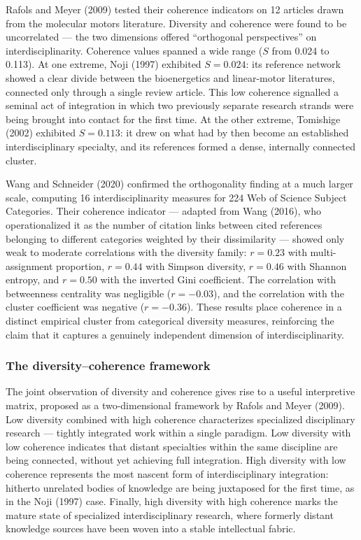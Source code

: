 \documentclass[
]{article}
\begin{document}
Rafols and Meyer (2009) tested their coherence indicators on 12 articles
drawn from the molecular motors literature. Diversity and coherence were
found to be uncorrelated --- the two dimensions offered ``orthogonal
perspectives'' on interdisciplinarity. Coherence values spanned a wide
range (\(S\) from 0.024 to 0.113). At one extreme, Noji (1997) exhibited
\(S = 0.024\): its reference network showed a clear divide between the
bioenergetics and linear-motor literatures, connected only through a
single review article. This low coherence signalled a seminal act of
integration in which two previously separate research strands were being
brought into contact for the first time. At the other extreme, Tomishige
(2002) exhibited \(S = 0.113\): it drew on what had by then become an
established interdisciplinary specialty, and its references formed a
dense, internally connected cluster.

Wang and Schneider (2020) confirmed the orthogonality finding at a much
larger scale, computing 16 interdisciplinarity measures for 224 Web of
Science Subject Categories. Their coherence indicator --- adapted from
Wang (2016), who operationalized it as the number of citation links
between cited references belonging to different categories weighted by
their dissimilarity --- showed only weak to moderate correlations with
the diversity family: \(r = 0.23\) with multi-assignment proportion,
\(r = 0.44\) with Simpson diversity, \(r = 0.46\) with Shannon entropy,
and \(r = 0.50\) with the inverted Gini coefficient. The correlation
with betweenness centrality was negligible (\(r = -0.03\)), and the
correlation with the cluster coefficient was negative (\(r = -0.36\)).
These results place coherence in a distinct empirical cluster from
categorical diversity measures, reinforcing the claim that it captures a
genuinely independent dimension of interdisciplinarity.

\hypertarget{the-diversitycoherence-framework}{%
\subsubsection{The diversity--coherence
framework}\label{the-diversitycoherence-framework}}

The joint observation of diversity and coherence gives rise to a useful
interpretive matrix, proposed as a two-dimensional framework by Rafols
and Meyer (2009). Low diversity combined with high coherence
characterizes specialized disciplinary research --- tightly integrated
work within a single paradigm. Low diversity with low coherence
indicates that distant specialties within the same discipline are being
connected, without yet achieving full integration. High diversity with
low coherence represents the most nascent form of interdisciplinary
integration: hitherto unrelated bodies of knowledge are being juxtaposed
for the first time, as in the Noji (1997) case. Finally, high diversity
with high coherence marks the mature state of specialized
interdisciplinary research, where formerly distant knowledge sources
have been woven into a stable intellectual fabric.
\end{document}

